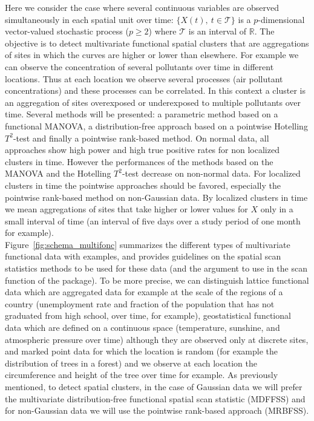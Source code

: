 Here we consider the case where several continuous variables are observed simultaneously in each spatial unit over time: $\{ X(t), \ t \in \mathcal{T} \}$ is a $p$-dimensional vector-valued stochastic process ($p \ge 2$) where $\mathcal{T}$ is an interval of $\mathbb{R}$. The objective is to detect multivariate functional spatial clusters that are aggregations of sites in which the curves are higher or lower than elsewhere. 
For example we can observe the concentration of several pollutants over time in different locations. Thus at each location we observe several processes (air pollutant concentrations) and these processes can be correlated.
In this context a cluster is an aggregation of sites overexposed or underexposed to multiple pollutants over time. Several methods will be presented: a parametric method based on a functional MANOVA, a distribution-free approach based on a pointwise Hotelling $T^2$-test and finally a pointwise rank-based method. On normal data, all approaches show high power and high true positive rates for non localized clusters in time. However the performances of the methods based on the MANOVA and the Hotelling $T^2$-test decrease on non-normal data. For localized clusters in time the pointwise approaches should be favored, especially the pointwise rank-based method on non-Gaussian data. By localized clusters in time we mean aggregations of sites that take higher or lower values for $X$ only in a small interval of time (an interval of five days over a study period of one month for example). \\
Figure~\ref{fig:schema_multifonc} summarizes the different types of multivariate functional data with examples, and provides guidelines on the spatial scan statistics methods to be used for these data (and the argument to use in the scan function of the package). To be more precise, we can distinguish lattice functional data which are aggregated data for example at the scale of the regions of a country (unemployment rate and fraction of the population that has not graduated from high school, over time, for example), geostatistical functional data which are defined on a continuous space (temperature, sunshine, and atmospheric pressure over time) although they are observed only at discrete sites, and marked point data for which the location is random (for example the distribution of trees in a forest) and we observe at each location the circumference and height of the tree over time for example. As previously mentioned, to detect spatial clusters, in the case of Gaussian data we will prefer the multivariate distribution-free functional spatial scan statistic (MDFFSS) and for non-Gaussian data we will use the pointwise rank-based approach (MRBFSS).\\

